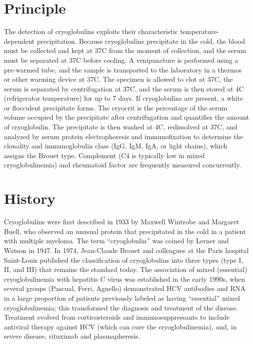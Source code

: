 \section*{Principle}
The detection of cryoglobulins exploits their characteristic temperature-dependent precipitation. Because cryoglobulins precipitate in the cold, the blood must be collected and kept at 37\textdegree{}C from the moment of collection, and the serum must be separated at 37\textdegree{}C before cooling. A venipuncture is performed using a pre-warmed tube, and the sample is transported to the laboratory in a thermos or other warming device at 37\textdegree{}C. The specimen is allowed to clot at 37\textdegree{}C, the serum is separated by centrifugation at 37\textdegree{}C, and the serum is then stored at 4\textdegree{}C (refrigerator temperature) for up to 7 days. If cryoglobulins are present, a white or flocculent precipitate forms. The cryocrit is the percentage of the serum volume occupied by the precipitate after centrifugation and quantifies the amount of cryoglobulin. The precipitate is then washed at 4\textdegree{}C, redissolved at 37\textdegree{}C, and analyzed by serum protein electrophoresis and immunofixation to determine the clonality and immunoglobulin class (IgG, IgM, IgA, or light chains), which assigns the Brouet type. Complement (C4 is typically low in mixed cryoglobulinemia) and rheumatoid factor are frequently measured concurrently.

\section*{History}
Cryoglobulins were first described in 1933 by Maxwell Wintrobe and Margaret Buell, who observed an unusual protein that precipitated in the cold in a patient with multiple myeloma. The term ``cryoglobulin'' was coined by Lerner and Watson in 1947. In 1974, Jean-Claude Brouet and colleagues at the Paris hospital Saint-Louis published the classification of cryoglobulins into three types (type I, II, and III) that remains the standard today. The association of mixed (essential) cryoglobulinemia with hepatitis C virus was established in the early 1990s, when several groups (Pascual, Ferri, Agnello) demonstrated HCV antibodies and RNA in a large proportion of patients previously labeled as having ``essential'' mixed cryoglobulinemia; this transformed the diagnosis and treatment of the disease. Treatment evolved from corticosteroids and immunosuppressants to include antiviral therapy against HCV (which can cure the cryoglobulinemia), and, in severe disease, rituximab and plasmapheresis.

